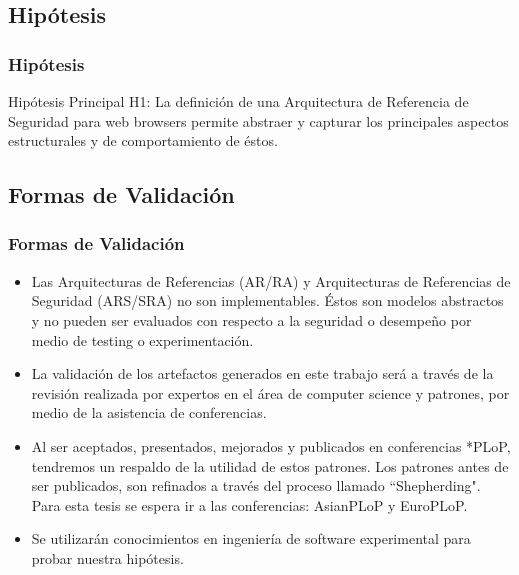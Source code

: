 \documentclass[serif,9pt]{beamer}
\begin{document}
\subsection{Hipótesis}
\begin{frame}
	\frametitle{Hipótesis}	
	\begin{block}{Hipótesis Principal}
			H1: La definición de una Arquitectura de Referencia de Seguridad para web browsers permite abstraer y capturar los principales aspectos estructurales y de comportamiento de éstos.
	\end{block}
\end{frame}

\subsection{Formas de Validación}
\begin{frame}
	\frametitle{Formas de Validación}	
	\begin{itemize}
	\item<1-> Las Arquitecturas de Referencias (AR/RA) y Arquitecturas de Referencias de Seguridad (ARS/SRA) no son implementables. Éstos son modelos abstractos y no pueden ser evaluados con respecto a la seguridad o desempeño por medio de testing o experimentación.
	\item<1-> La validación de los artefactos generados en este trabajo será a través de la revisión realizada por expertos en el área de computer science y patrones, por medio de la asistencia de conferencias. 
	\item<2-> Al ser aceptados, presentados, mejorados y publicados en conferencias *PLoP, tendremos un respaldo de la utilidad de estos patrones. Los patrones antes de ser publicados, son refinados a través del proceso llamado ``Shepherding". Para esta tesis se espera ir a las conferencias: AsianPLoP y EuroPLoP.
	\item<2-> Se utilizarán conocimientos en ingeniería de software experimental para probar nuestra hipótesis. 
	\end{itemize}
\end{frame}
\end{document}
